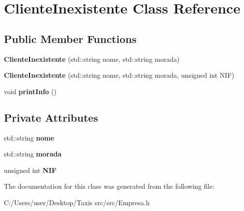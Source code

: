 \hypertarget{class_cliente_inexistente}{}\section{Cliente\+Inexistente Class Reference}
\label{class_cliente_inexistente}
\subsection*{Public Member Functions}
\begin{DoxyCompactItemize}
\item 
\mbox{\label{class_cliente_inexistente_af0451741cd6c658bfe981c2589ca6285}} 
{\bfseries Cliente\+Inexistente} (std\+::string nome, std\+::string morada)
\item 
\mbox{\label{class_cliente_inexistente_a0792c70fde5b7f2e29ccad035acaa7b8}} 
{\bfseries Cliente\+Inexistente} (std\+::string nome, std\+::string morada, unsigned int N\+IF)
\item 
\mbox{\label{class_cliente_inexistente_a41daf5a590224c14a40329686ff2e0e6}} 
void {\bfseries print\+Info} ()
\end{DoxyCompactItemize}
\subsection*{Private Attributes}
\begin{DoxyCompactItemize}
\item 
\mbox{\label{class_cliente_inexistente_acb18f88084236fd6ecfc9af59605c4d8}} 
std\+::string {\bfseries nome}
\item 
\mbox{\label{class_cliente_inexistente_a562fb3314372bea473711dc6b50641d8}} 
std\+::string {\bfseries morada}
\item 
\mbox{\label{class_cliente_inexistente_ad64664c5a6ac9cf9f4b5d3991ddbb7fd}} 
unsigned int {\bfseries N\+IF}
\end{DoxyCompactItemize}


The documentation for this class was generated from the following file\+:\begin{DoxyCompactItemize}
\item 
C\+:/\+Users/user/\+Desktop/\+Taxis src/src/Empresa.\+h\end{DoxyCompactItemize}
